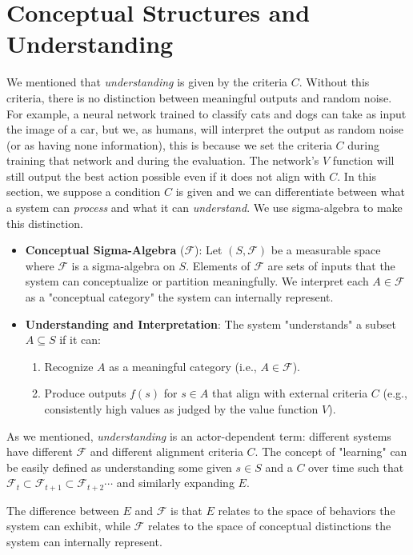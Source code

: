 \documentclass[]{article}
\begin{document}
\section{Conceptual Structures and Understanding}
We mentioned that \textit{understanding} is given by the criteria $C$. Without this criteria, there is no distinction between meaningful outputs and random noise. For example, a neural network trained to classify cats and dogs can take as input the image of a car, but we, as humans, will interpret the output as random noise (or as having none information), this is because we set the criteria $C$ during training that network and during the evaluation. The network's $V$ function will still output the best action possible even if it does not align with $C$.
In this section, we suppose a condition $C$ is given and we can differentiate between what a system can \textit{process} and what it can \textit{understand}. We use sigma-algebra to make this distinction.
\begin{itemize}
	\item \textbf{Conceptual Sigma-Algebra} ($\mathcal{F}$): Let $(S, \mathcal{F})$ be a measurable space where $\mathcal{F}$ is a sigma-algebra on $S$. Elements of $\mathcal{F}$ are sets of inputs that the system can conceptualize or partition meaningfully. We interpret each $A \in \mathcal{F}$ as a "conceptual category" the system can internally represent.
	\item \textbf{Understanding and Interpretation}: The system "understands" a subset $A \subseteq S$ if it can:
	\begin{enumerate}
		\item Recognize $A$ as a meaningful category (i.e., $A \in \mathcal{F}$).
		\item Produce outputs $f(s)$ for $s \in A$ that align with external criteria $C$ (e.g., consistently high values as judged by the value function $V$).
	\end{enumerate}
\end{itemize}
As we mentioned, \textit{understanding} is an actor-dependent term: different systems have different $\mathcal{F}$ and different alignment criteria $C$. The concept of "learning" can be easily defined as understanding some given $s \in S$ and a $C$ over time such that $\mathcal{F}_t \subset \mathcal{F}_{t+1} \subset \mathcal{F}_{t+2} \cdots$ and similarly expanding $E$.

The difference between $E$ and $\mathcal{F}$ is that $E$ relates to the space of behaviors the system can exhibit, while $\mathcal{F}$ relates to the space of conceptual distinctions the system can internally represent.
\end{document}
